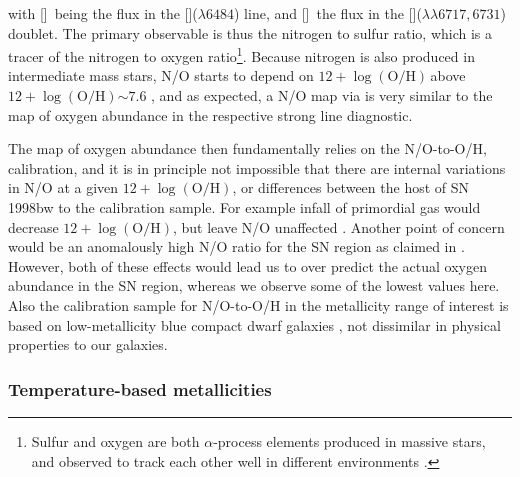 \documentclass[traditabstract]{aa}
\newcommand{\oh}{$12+\log(\mathrm{O/H})$}
\newcommand{\sii}{[\ion{S}{ii}]}
\newcommand{\nii}{[\ion{N}{ii}]}
\begin{document}
with \nii\, being the flux in the \nii($\lambda6484$) line, and \sii\, the flux in the \sii($\lambda\lambda6717,6731$) doublet. The primary observable is thus the nitrogen to sulfur ratio, which is a tracer of the nitrogen to oxygen ratio\footnote{Sulfur and oxygen are both $\alpha$-process elements produced in massive stars, and observed to track each other well in different environments \citep[see e.g., Figure 6 in][]{2006A&A...448..955I}.}. Because nitrogen is also produced in intermediate mass stars, N/O starts to depend on \oh\,above \oh$\sim 7.6$ \citep[e.g.][]{1999ApJ...511..639I, 2013A&A...549A..25P}, and as expected, a N/O map via \citet{2010ApJ...715L.128A} is very similar to the map of oxygen abundance in the respective strong line diagnostic. 

The map of oxygen abundance then fundamentally relies on the N/O-to-O/H, calibration, and it is in principle not impossible that there are internal variations in N/O at a given \oh, or differences between the host of SN\,1998bw to the calibration sample. For example infall of primordial gas would decrease \oh, but leave N/O unaffected \citep{2016ApJ...823L..24K}. Another point of concern would be an anomalously high N/O ratio for the SN region as claimed in \citet{2006A&A...454..103H}. However, both of these effects would lead us to over predict the actual oxygen abundance in the SN region, whereas we observe some of the lowest values here. Also the calibration sample for N/O-to-O/H in the metallicity range of interest is based on low-metallicity blue compact dwarf galaxies \citep{1999ApJ...511..639I}, not dissimilar in physical properties to our galaxies. %

\subsubsection{Temperature-based metallicities}
\end{document}
